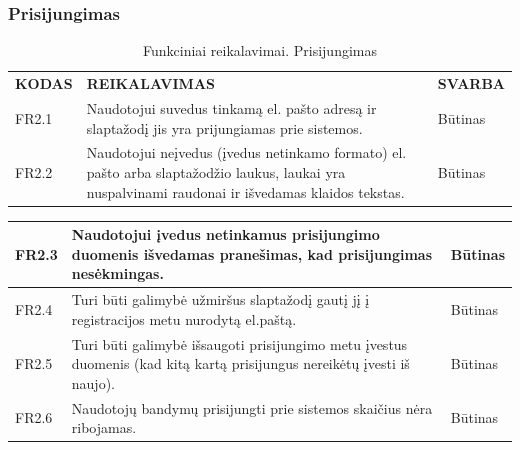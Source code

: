 \documentclass{VUMIFPSkursinis}
\begin{document}
\subsubsection{Prisijungimas}
\begin{table}[H]
\caption{Funkciniai reikalavimai. Prisijungimas}
\centering
\normalsize
\begin{tabular}{|p{2cm}|p{10cm}|p{3cm}|}
\hline
\rowcolor{gray!30}
\multicolumn{3}{|l|}{\textbf{2. Prisijungimas}} \\ \hline
\textbf{KODAS}& \multicolumn{1}{m{10cm}|}{\textbf{REIKALAVIMAS}} & \textbf{SVARBA} \\ \hline
FR2.1 & \multicolumn{1}{m{10cm}|}{Naudotojui suvedus tinkamą el. pašto adresą ir slaptažodį jis yra prijungiamas prie sistemos.} & Būtinas \\ \hline
FR2.2 & \multicolumn{1}{m{10cm}|}{Naudotojui neįvedus (įvedus netinkamo formato) el. pašto arba slaptažodžio laukus, laukai yra nuspalvinami raudonai ir išvedamas klaidos tekstas.} & Būtinas \\ \hline

\end{tabular}

\end{table}

\begin{table}[H]
\centering
\normalsize
\begin{tabular}{|p{2cm}|p{10cm}|p{3cm}|}
\hline
FR2.3 & \multicolumn{1}{m{10cm}|}{Naudotojui įvedus netinkamus prisijungimo duomenis išvedamas pranešimas, kad prisijungimas nesėkmingas.} & Būtinas \\ \hline
FR2.4 & \multicolumn{1}{m{10cm}|}{Turi būti galimybė užmiršus slaptažodį gautį jį į registracijos metu nurodytą el.paštą.} & Būtinas \\ \hline
FR2.5 & \multicolumn{1}{m{10cm}|}{Turi būti galimybė išsaugoti prisijungimo metu įvestus duomenis (kad kitą kartą prisijungus nereikėtų įvesti iš naujo).} & Būtinas \\ \hline
FR2.6 & \multicolumn{1}{m{10cm}|}{Naudotojų bandymų prisijungti prie sistemos skaičius nėra ribojamas.} & Būtinas \\ \hline
\end{tabular}

\end{table}
\end{document}
